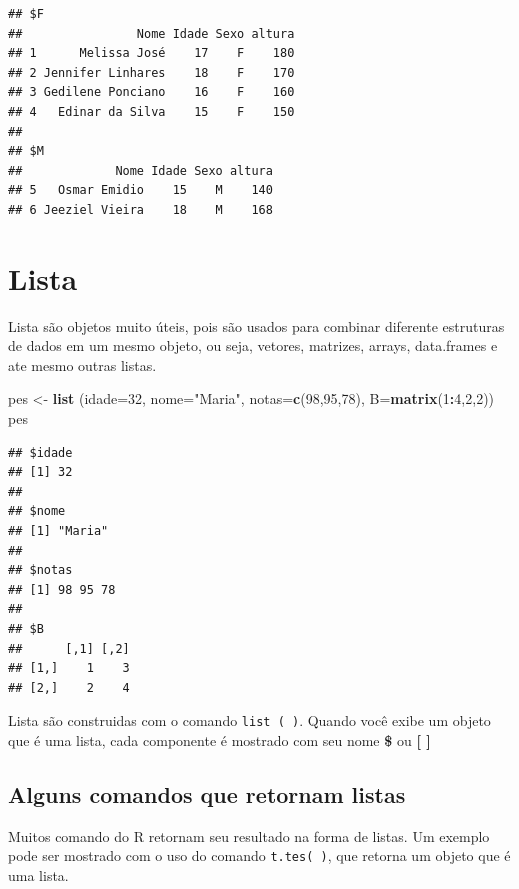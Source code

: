 \documentclass[]{book}
\newenvironment{Shaded}{\begin{snugshade}}{\end{snugshade}}
\newcommand{\DataTypeTok}[1]{\textcolor[rgb]{0.13,0.29,0.53}{#1}}
\newcommand{\DecValTok}[1]{\textcolor[rgb]{0.00,0.00,0.81}{#1}}
\newcommand{\KeywordTok}[1]{\textcolor[rgb]{0.13,0.29,0.53}{\textbf{#1}}}
\newcommand{\NormalTok}[1]{#1}
\newcommand{\OperatorTok}[1]{\textcolor[rgb]{0.81,0.36,0.00}{\textbf{#1}}}
\newcommand{\StringTok}[1]{\textcolor[rgb]{0.31,0.60,0.02}{#1}}
\begin{document}
\begin{verbatim}
## $F
##                Nome Idade Sexo altura
## 1      Melissa José    17    F    180
## 2 Jennifer Linhares    18    F    170
## 3 Gedilene Ponciano    16    F    160
## 4   Edinar da Silva    15    F    150
## 
## $M
##             Nome Idade Sexo altura
## 5   Osmar Emidio    15    M    140
## 6 Jeeziel Vieira    18    M    168
\end{verbatim}

\hypertarget{lista}{%
\section{Lista}\label{lista}}

Lista são objetos muito úteis, pois são usados para combinar diferente estruturas de dados em um mesmo objeto, ou seja, vetores, matrizes, arrays, data.frames e ate mesmo outras listas.

\begin{Shaded}
\begin{Highlighting}[]
\NormalTok{pes <-}\StringTok{ }\KeywordTok{list}\NormalTok{ (}\DataTypeTok{idade=}\DecValTok{32}\NormalTok{, }\DataTypeTok{nome=}\StringTok{"Maria"}\NormalTok{, }\DataTypeTok{notas=}\KeywordTok{c}\NormalTok{(}\DecValTok{98}\NormalTok{,}\DecValTok{95}\NormalTok{,}\DecValTok{78}\NormalTok{), }\DataTypeTok{B=}\KeywordTok{matrix}\NormalTok{(}\DecValTok{1}\OperatorTok{:}\DecValTok{4}\NormalTok{,}\DecValTok{2}\NormalTok{,}\DecValTok{2}\NormalTok{))}
\NormalTok{pes}
\end{Highlighting}
\end{Shaded}

\begin{verbatim}
## $idade
## [1] 32
## 
## $nome
## [1] "Maria"
## 
## $notas
## [1] 98 95 78
## 
## $B
##      [,1] [,2]
## [1,]    1    3
## [2,]    2    4
\end{verbatim}

Lista são construidas com o comando \texttt{list\ (\ )}. Quando você exibe um objeto que é uma lista, cada componente é mostrado com seu nome \textbf{\$} ou \textbf{{[} {]}}

\hypertarget{alguns-comandos-que-retornam-listas}{%
\subsection{Alguns comandos que retornam listas}\label{alguns-comandos-que-retornam-listas}}

Muitos comando do R retornam seu resultado na forma de listas. Um exemplo pode ser mostrado com o uso do comando \texttt{t.tes(\ )}, que retorna um objeto que é uma lista.
\end{document}

